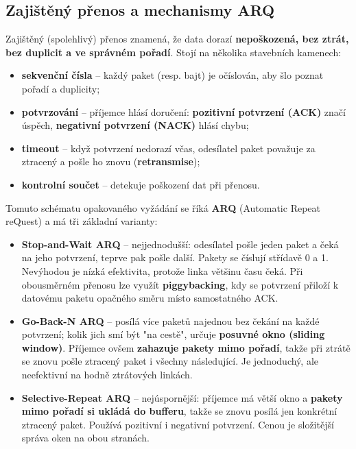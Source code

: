 \subsection*{Zajištěný přenos a mechanismy ARQ}
Zajištěný (spolehlivý) přenos znamená, že data dorazí \textbf{nepoškozená, bez ztrát, bez duplicit a ve správném pořadí}. Stojí na několika stavebních kamenech:
\begin{itemize}
  \item \textbf{sekvenční čísla} -- každý paket (resp. bajt) je očíslován, aby šlo poznat pořadí a duplicity;
  \item \textbf{potvrzování} -- příjemce hlásí doručení: \textbf{pozitivní potvrzení (ACK)} značí úspěch, \textbf{negativní potvrzení (NACK)} hlásí chybu;
  \item \textbf{timeout} -- když potvrzení nedorazí včas, odesílatel paket považuje za ztracený a pošle ho znovu (\textbf{retransmise});
  \item \textbf{kontrolní součet} -- detekuje poškození dat při přenosu.
\end{itemize}
Tomuto schématu opakovaného vyžádání se říká \textbf{ARQ} (Automatic Repeat reQuest) a má tři základní varianty:
\begin{itemize}
  \item \textbf{Stop-and-Wait ARQ} -- nejjednodušší: odesílatel pošle jeden paket a čeká na jeho potvrzení, teprve pak pošle další. Pakety se číslují střídavě 0 a 1. Nevýhodou je nízká efektivita, protože linka většinu času čeká. Při obousměrném přenosu lze využít \textbf{piggybacking}, kdy se potvrzení přiloží k datovému paketu opačného směru místo samostatného ACK.
  \item \textbf{Go-Back-N ARQ} -- posílá více paketů najednou bez čekání na každé potvrzení; kolik jich smí být "na cestě", určuje \textbf{posuvné okno (sliding window)}. Příjemce ovšem \textbf{zahazuje pakety mimo pořadí}, takže při ztrátě se znovu pošle ztracený paket i všechny následující. Je jednoduchý, ale neefektivní na hodně ztrátových linkách.
  \item \textbf{Selective-Repeat ARQ} -- nejúspornější: příjemce má větší okno a \textbf{pakety mimo pořadí si ukládá do bufferu}, takže se znovu posílá jen konkrétní ztracený paket. Používá pozitivní i negativní potvrzení. Cenou je složitější správa oken na obou stranách.
\end{itemize}

